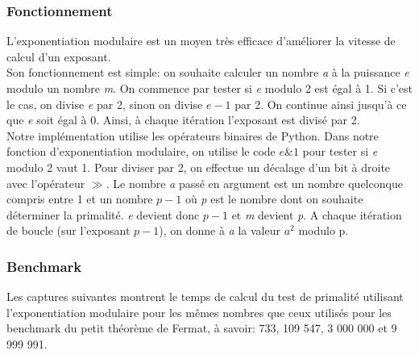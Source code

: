 \subsubsection{Fonctionnement}
L'exponentiation modulaire est un moyen très efficace d'améliorer la vitesse de calcul d'un exposant.\\

Son fonctionnement est simple: on souhaite calculer un nombre \textit{a} à la puissance \textit{e} modulo un nombre \textit{m}. On commence par tester si \textit{e} modulo 2 est égal à 1. Si c'est le cas, on divise \textit{e} par 2, sinon on divise $e-1$ par 2. On continue ainsi jusqu'à ce que \textit{e} soit égal à 0.
Ainsi, à chaque itération l'exposant est divisé par 2.\\

Notre implémentation utilise les opérateurs binaires de Python. Dans notre fonction d'exponentiation modulaire, on utilise le code \textit{$e\&1$} pour tester si \textit{e} modulo 2 vaut 1. Pour diviser par 2, on effectue un décalage d'un bit à droite avec l'opérateur $\gg$.
Le nombre \textit{a} passé en argument est un nombre quelconque compris entre 1 et un nombre $p-1$ où \textit{p} est le nombre dont on souhaite déterminer la primalité. \textit{e} devient donc $p-1$ et \textit{m} devient \textit{p}. A chaque itération de boucle (sur l'exposant $p-1$), on donne à \textit{a} la valeur $a^2 $ modulo p.
\subsubsection{Benchmark}

Les captures suivantes montrent le temps de calcul du test de primalité utilisant l'exponentiation modulaire pour les mêmes nombres que ceux utilisés pour les benchmark du petit théorème de Fermat, à savoir: 733, 109 547, 3 000 000 et 9 999 991.\\

